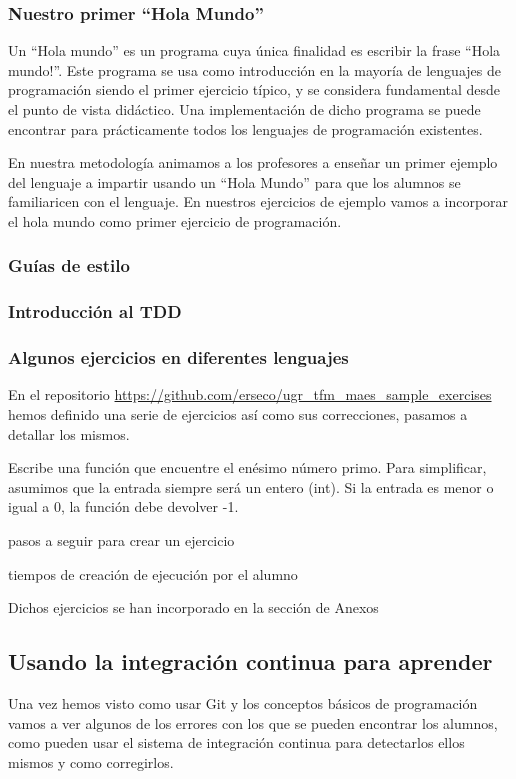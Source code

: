 \subsubsection{Nuestro primer ``Hola Mundo''}

Un ``Hola mundo'' es un programa cuya única finalidad es escribir la frase ``Hola mundo!''. Este programa se usa como introducción en la mayoría de lenguajes de programación siendo el primer ejercicio típico, y se considera fundamental desde el punto de vista didáctico. Una implementación de dicho programa se puede encontrar para prácticamente todos los lenguajes de programación existentes.

\bigskip
En nuestra metodología animamos a los profesores a enseñar un primer ejemplo del lenguaje a impartir usando un ``Hola Mundo'' para que los alumnos se familiaricen con el lenguaje. En nuestros ejercicios de ejemplo vamos a incorporar el hola mundo como primer ejercicio de programación.

\subsubsection{Guías de estilo}
\subsubsection{Introducción al TDD}
\subsubsection{Algunos ejercicios en diferentes lenguajes}

En el repositorio \url{https://github.com/erseco/ugr_tfm_maes_sample_exercises} hemos definido una serie de ejercicios así como sus correcciones, pasamos a detallar los mismos.


Escribe una función que encuentre el enésimo número primo. Para simplificar, asumimos que la entrada siempre será un entero (int). Si la entrada es menor o igual a 0, la función debe devolver -1.

pasos a seguir para crear un ejercicio

tiempos de creación de ejecución por el alumno

Dichos ejercicios se han incorporado en la sección de Anexos


\subsection{Usando la integración continua para aprender}

Una vez hemos visto como usar Git y los conceptos básicos de programación vamos a ver algunos de los errores con los que se pueden encontrar los alumnos, como pueden usar el sistema de integración continua para detectarlos ellos mismos y como corregirlos.




